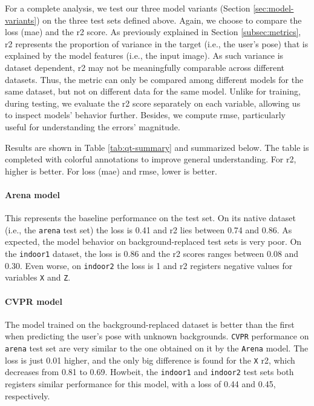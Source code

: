 For a complete analysis, we test our three model variants (Section \ref{sec:model-variants}) on the three test sets defined above. Again, we choose to compare the loss (\gls{mae}) and the \gls{r2} score. As previously explained in Section \ref{subsec:metrics}, \gls{r2} represents the proportion of variance in the target (i.e., the user's pose) that is explained by the model features (i.e., the input image). As such variance is dataset dependent, \gls{r2} may not be meaningfully comparable across different datasets. Thus, the metric can only be compared among different models for the same dataset, but not on different data for the same model. Unlike for training, during testing, we evaluate the \gls{r2} score separately on each variable, allowing us to inspect models' behavior further. Besides, we compute \gls{rmse}, particularly useful for understanding the errors' magnitude.

Results are shown in Table \ref{tab:qt-summary} and summarized below. The table is completed with colorful annotations to improve general understanding. For \gls{r2}, higher is better. For loss (\gls{mae}) and \gls{rmse}, lower is better.

\paragraph*{Arena model}

This represents the baseline performance on the test set. On its native dataset (i.e., the \texttt{arena} test set) the loss is 0.41 and \gls{r2} lies between 0.74 and 0.86. As expected, the model behavior on background-replaced test sets is very poor. On the \texttt{indoor1} dataset, the loss is 0.86 and the \gls{r2} scores ranges between 0.08 and 0.30. Even worse, on \texttt{indoor2} the loss is 1 and \gls{r2} registers negative values for variables \texttt{X} and \texttt{Z}.

\paragraph*{CVPR model}

The model trained on the background-replaced dataset is better than the first when predicting the user's pose with unknown backgrounds. \texttt{CVPR} performance on \texttt{arena} test set are very similar to the one obtained on it by the \texttt{Arena} model. The loss is just 0.01 higher, and the only big difference is found for the \texttt{X} \gls{r2}, which decreases from 0.81 to 0.69. Howbeit, the \texttt{indoor1} and \texttt{indoor2} test sets both registers similar performance for this model, with a loss of 0.44 and 0.45, respectively.

